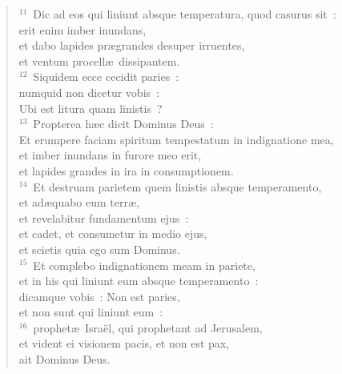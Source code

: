 \begin{flushleft}
\begin{verse}
${}^{11}$~Dic ad eos qui liniunt absque temperatura, quod casurus sit~:\\ erit enim imber inundans,\\ et dabo lapides pr\ae grandes desuper irruentes,\\ et ventum procell\ae\ dissipantem.\\
${}^{12}$~Siquidem ecce cecidit paries~:\\ numquid non dicetur vobis~:\\ Ubi est litura quam linistis~?\\
${}^{13}$~Propterea h\ae c dicit Dominus Deus~:\\ Et erumpere faciam spiritum tempestatum in indignatione mea,\\ et imber inundans in furore meo erit,\\ et lapides grandes in ira in consumptionem.\\
${}^{14}$~Et destruam parietem quem linistis absque temperamento,\\ et ad\ae quabo eum terr\ae ,\\ et revelabitur fundamentum ejus~:\\ et cadet, et consumetur in medio ejus,\\ et scietis quia ego sum Dominus.\\
${}^{15}$~Et complebo indignationem meam in pariete,\\ et in his qui liniunt eum absque temperamento~:\\ dicamque vobis~: Non est paries,\\ et non sunt qui liniunt eum~:\\
${}^{16}$~prophet\ae\ Isra\"el, qui prophetant ad Jerusalem,\\ et vident ei visionem pacis, et non est pax,\\ ait Dominus Deus.\end{verse}\end{flushleft}


